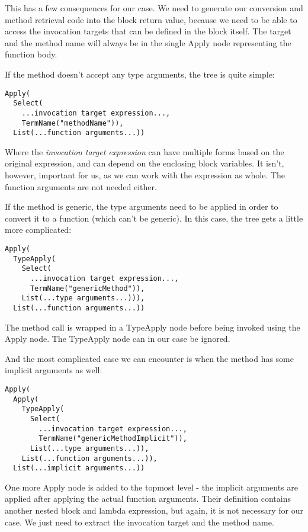 This has a few consequences for our case. We need to generate our conversion and method retrieval code into the block return value, because we need to be able to access the invocation targets that can be defined in the block itself. The target and the method name will always be in the single Apply node representing the function body.

If the method doesn't accept any type arguments, the tree is quite simple:

\lstset{style=Dump}
\begin{lstlisting}
Apply(
  Select(
    ...invocation target expression..., 
    TermName("methodName")), 
  List(...function arguments...))
\end{lstlisting}

Where the \textit{invocation target expression} can have multiple forms based on the original expression, and can depend on the enclosing block variables. It isn't, however, important for us, as we can work with the expression as whole. The function arguments are not needed either.

If the method is generic, the type arguments need to be applied in order to convert it to a function (which can't be generic). In this case, the tree gets a little more complicated:

\lstset{style=Dump}
\begin{lstlisting}
Apply(
  TypeApply(
    Select(
      ...invocation target expression..., 
      TermName("genericMethod")), 
    List(...type arguments...))), 
  List(...function arguments...))
\end{lstlisting}

The method call is wrapped in a TypeApply node before being invoked using the Apply node. The TypeApply node can in our case be ignored.

And the most complicated case we can encounter is when the method has some implicit arguments as well:

\lstset{style=Dump}
\begin{lstlisting}
Apply(
  Apply(
    TypeApply(
      Select(
        ...invocation target expression...,
        TermName("genericMethodImplicit")), 
      List(...type arguments...)), 
    List(...function arguments...)), 
  List(...implicit arguments...))
\end{lstlisting}

One more Apply node is added to the topmost level - the implicit arguments are applied after applying the actual function arguments. Their definition contains another nested block and lambda expression, but again, it is not necessary for our case. We just need to extract the invocation target and the method name.

